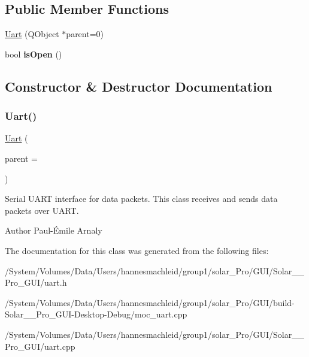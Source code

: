 \subsection*{Public Member Functions}
\begin{DoxyCompactItemize}
\item 
\mbox{\hyperlink{class_uart_a6a5a57f6ead9702ae4475ad2642f68dc}{Uart}} (Q\+Object $\ast$parent=0)
\item 
\mbox{\label{class_uart_a3a9ba7594ee74425dd345ecc263a5564}} 
bool {\bfseries is\+Open} ()
\end{DoxyCompactItemize}


\subsection{Constructor \& Destructor Documentation}
\mbox{\label{class_uart_a6a5a57f6ead9702ae4475ad2642f68dc}} 
\subsubsection{\texorpdfstring{Uart()}{Uart()}}
{\footnotesize\ttfamily \mbox{\hyperlink{class_uart}{Uart}} (\begin{DoxyParamCaption}\item[{Q\+Object $\ast$}]{parent = {} }\end{DoxyParamCaption})\hspace{0.3cm}{\ttfamily [explicit]}}

Serial U\+A\+RT interface for data packets. This class receives and sends data packets over U\+A\+RT. \begin{DoxyAuthor}{Author}
Paul-\/Émile Arnaly 
\end{DoxyAuthor}


The documentation for this class was generated from the following files\+:\begin{DoxyCompactItemize}
\item 
/\+System/\+Volumes/\+Data/\+Users/hannesmachleid/group1/solar\+\_\+\+Pro/\+G\+U\+I/\+Solar\+\_\+\+\_\+\+Pro\+\_\+\+G\+U\+I/uart.\+h\item 
/\+System/\+Volumes/\+Data/\+Users/hannesmachleid/group1/solar\+\_\+\+Pro/\+G\+U\+I/build-\/\+Solar\+\_\+\+\_\+\+Pro\+\_\+\+G\+U\+I-\/\+Desktop-\/\+Debug/moc\+\_\+uart.\+cpp\item 
/\+System/\+Volumes/\+Data/\+Users/hannesmachleid/group1/solar\+\_\+\+Pro/\+G\+U\+I/\+Solar\+\_\+\+\_\+\+Pro\+\_\+\+G\+U\+I/uart.\+cpp\end{DoxyCompactItemize}
